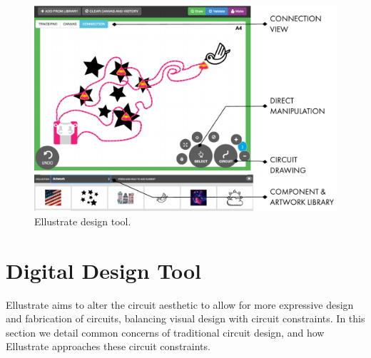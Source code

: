 \documentclass{sigchi}
\begin{document}
        
    

\begin{figure}[t]
\centering
\includegraphics[width=1.0\columnwidth]{figures/designtool.pdf}
\caption{Ellustrate design tool. }
\label{fig:design_tool}
\end{figure}
\section{Digital Design Tool}
    Ellustrate aims to alter the circuit aesthetic to allow for more expressive design and fabrication of circuits, balancing visual design with circuit constraints. In this section we detail common concerns of traditional circuit design, and how Ellustrate approaches these circuit constraints. 
             
             
\end{document}
